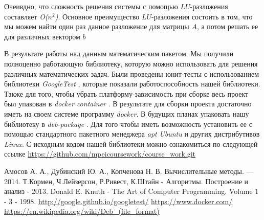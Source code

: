 \documentclass[a4paper,article,14pt]{extarticle}
\begin{document}
Очеивдно, что сложность решения системы с помощью
$LU$-разложения составляет \emph{O($n^2$)}.
Основное преимущество $LU$-разложения
состоить в том, что мы можем найти один раз данное разложение 
для матрицы $A$, а потом решать ее для различных вектором $b$

\newpage

В результате работы над данным математическим пакетом. Мы получили полноценно 
работающую библиотеку, которую можно использовать для решения различных математических
задач. Были проведены юнит-тесты с использованием библиотеки \emph{GoogleTest} \cite{item4}, которые
показали работоспособность нашей библиотеки.
Также для того, чтобы убрать платформу-зависимость при сборке весь проект был упакован в \emph{docker container}
\cite{item5}. В результате для сборки проекта достаточно иметь на своем системе программу \emph{docker}. 
В будущих планах упаковать нашу библиотеку в \emph{deb-package} \cite{item6}. Для того чтобы иметь возможность 
установить ее с помощью стандартного пакетного менеджера \emph{apt}  \emph{Ubuntu} и других дистрибутивов \emph{Linux}. 
С исходным кодом нашей библиотеки можно ознакомиться по следующей 
ссылке \url{https://github.com/mpeicoursework/course_work.git}

\newpage
\begin{thebibliography}{1}
 Амосов А. А., Дубинский Ю. А., Копченова Н. В. Вычислительные методы. — 2014.
 Т.Кормен, Ч.Лейзерсон, Р.Ривест, К.Штайн - Алгоритмы. Построение и анализ - 2013.
 Donald E. Knuth - The Art of Computer Programming. Volume 1 - 3 - 1998.
 \url{http://google.github.io/googletest/}
 \url{https://www.docker.com/}
 \url{https://en.wikipedia.org/wiki/Deb_(file_format)}
\end{thebibliography}
\end{document}

